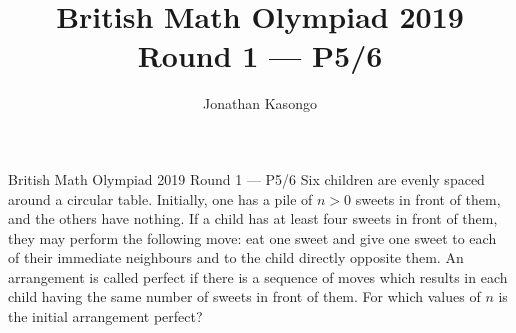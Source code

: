 \documentclass{article}
\author{Jonathan Kasongo}
\title{British Math Olympiad 2019 Round 1 --- P5/6}
\begin{document}
\maketitle

\begin{problem}{British Math Olympiad 2019 Round 1 --- P5/6}
Six children are evenly spaced around a circular table. Initially, one has a pile
of $n > 0$ sweets in front of them, and the others have nothing. If a child has
at least four sweets in front of them, they may perform the following move:
eat one sweet and give one sweet to each of their immediate neighbours and
to the child directly opposite them. An arrangement is called perfect if there
is a sequence of moves which results in each child having the same number
of sweets in front of them. For which values of $n$ is the initial arrangement
perfect?
\end{problem}
\end{document}

